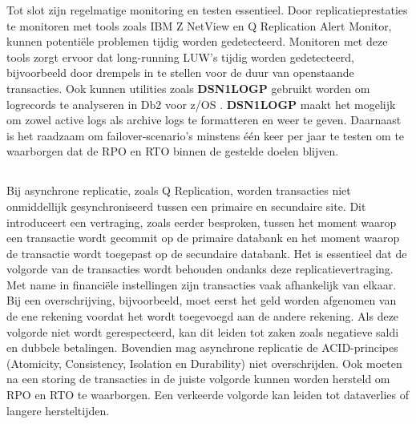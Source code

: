 Tot slot zijn regelmatige monitoring en testen essentieel. 
Door replicatieprestaties te monitoren met tools zoals IBM Z NetView en Q Replication Alert Monitor, kunnen potentiële problemen tijdig worden gedetecteerd. 
Monitoren met deze tools zorgt ervoor dat long-running LUW's tijdig worden gedetecteerd, bijvoorbeeld door drempels in te stellen voor de duur van openstaande transacties.
Ook kunnen utilities zoals \textbf{DSN1LOGP} gebruikt worden om logrecords te analyseren in Db2 voor z/OS \autocite{ibm_2026_dsn1logp}.
\textbf{DSN1LOGP} maakt het mogelijk om zowel active logs als archive logs te formatteren en weer te geven.
Daarnaast is het raadzaam om failover-scenario's minstens één keer per jaar te testen om te waarborgen dat de RPO en RTO binnen de gestelde doelen blijven.

\subsection{}
\label{sec:asynchrone-log-replicatie-inconsistenties-volgorde-logreplicatie}

Bij asynchrone replicatie, zoals Q Replication, worden transacties niet onmiddellijk gesynchroniseerd tussen een primaire en secundaire site.
Dit introduceert een vertraging, zoals eerder besproken, tussen het moment waarop een transactie wordt gecommit op de primaire databank en het moment waarop de transactie wordt toegepast op de secundaire databank.
Het is essentieel dat de volgorde van de transacties wordt behouden ondanks deze replicatievertraging.
Met name in financiële instellingen zijn transacties vaak afhankelijk van elkaar.
Bij een overschrijving, bijvoorbeeld, moet eerst het geld worden afgenomen van de ene rekening voordat het wordt toegevoegd aan de andere rekening.
Als deze volgorde niet wordt gerespecteerd, kan dit leiden tot zaken zoals negatieve saldi en dubbele betalingen.
Bovendien mag asynchrone replicatie de ACID-principes (Atomicity, Consistency, Isolation en Durability) niet overschrijden. 
Ook moeten na een storing de transacties in de juiste volgorde kunnen worden hersteld om RPO en RTO te waarborgen.
Een verkeerde volgorde kan leiden tot dataverlies of langere hersteltijden.

\subsubsection{}
\label{sec:asynchrone-log-replicatie-logrecordverwerking-db2}

